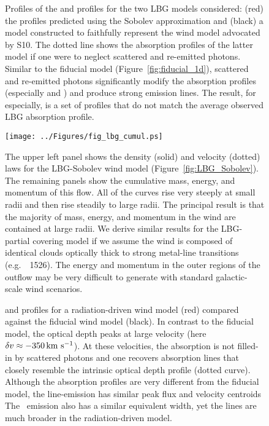 \documentclass[12pt,preprint]{aastex}
\begin{document}
\clearpage

\begin{figure}
\caption{
Profiles of the  and  profiles for the two
LBG models considered: (red) the profiles predicted using the 
Sobolev approximation 
and (black) a model constructed to faithfully
represent the wind model advocated by S10.  The dotted line
shows the absorption profiles of the latter model if one were
to neglect scattered and re-emitted photons.  Similar to the fiducial
model (Figure~\ref{fig:fiducial_1d}), scattered and re-emitted photons
significantly modify the absorption profiles (especially 
and \feiib)
and produce strong emission lines.  
The result, for  especially, is a set of profiles that do
not match the average observed LBG absorption profile.
}
\label{fig:LBG_spec}
\end{figure}

\begin{figure}
\texttt{[image: ../Figures/fig\_lbg\_cumul.ps]}
\caption{
The upper left panel shows the density (solid) and velocity (dotted)
laws for the LBG-Sobolev wind model (Figure~\ref{fig:LBG_Sobolev}).
The remaining panels show the cumulative mass, energy, and momentum of
this flow.  All of the curves rise very steeply at small radii and
then rise steadily to large radii.  The principal result is that the
majority of mass, energy, and momentum in the wind are contained at
large radii.  We derive similar results for the LBG-partial covering model
if we assume the wind is composed of identical clouds optically thick
to strong metal-line transitions (e.g.\ ~1526).  The
energy and momentum in the outer regions of the outflow may be very
difficult to generate with standard galactic-scale wind scenarios.
}
\label{fig:LBG_cumul}
\end{figure}



\begin{figure}
\caption{
 and 
profiles for a radiation-driven wind model (red) compared against the
fiducial wind model (black).  In contrast to the fiducial model, the
optical depth peaks at large velocity (here $\delta v
\approx -350 \, {\rm km~s^{-1}}$).  At these velocities, the absorption is not
filled-in by scattered photons and one recovers absorption lines
that closely resemble the intrinsic optical depth profile (dotted
curve).  Although the  absorption profiles are very
different from the fiducial model, the  line-emission has
similar peak flux and velocity centroids 
The \feiis\ emission also has a similar
equivalent width, yet the lines are much broader in the
radiation-driven model. 
}
\label{fig:rad_spec}
\end{figure}
\end{document}
